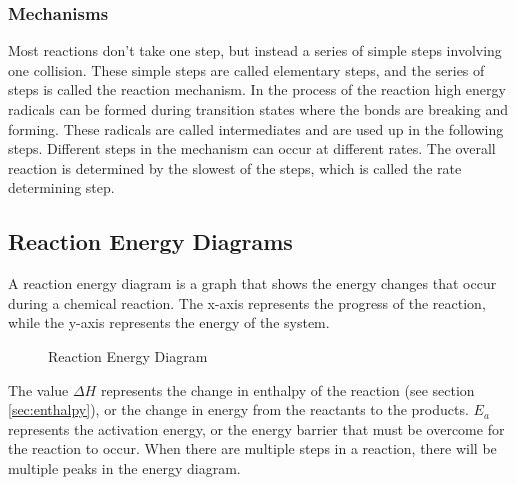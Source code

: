 \subsubsection{Mechanisms}
Most reactions don't take one step, but instead a series of simple steps involving one collision. These simple steps are called elementary steps, and the series of steps is called the reaction mechanism. In the process of the reaction high energy radicals can be formed during transition states where the bonds are breaking and forming. These radicals are called intermediates and are used up in the following steps. Different steps in the mechanism can occur at different rates. The overall reaction is determined by the slowest of the steps, which is called the rate determining step. 
\subsection{Reaction Energy Diagrams}
A reaction energy diagram is a graph that shows the energy changes that occur during a chemical reaction. The x-axis represents the progress of the reaction, while the y-axis represents the energy of the system. 
\begin{figure}[h]
    \centering
    \caption{Reaction Energy Diagram}
    \label{fig:ReactionEnergyDiagram}
\end{figure}
The value $\Delta H$ represents the change in enthalpy of the reaction (see section \ref{sec:enthalpy}), or the change in energy from the reactants to the products. $E_a$ represents the activation energy, or the energy barrier that must be overcome for the reaction to occur. When there are multiple steps in a reaction, there will be multiple peaks in the energy diagram.
